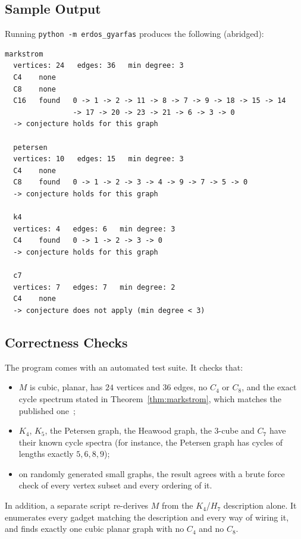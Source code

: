 \documentclass[11pt,a4paper]{article}
\theoremstyle{definition}
\newcommand{\C}[1]{C_{#1}}
\begin{document}
\subsection{Sample Output}

Running \texttt{python -m erdos\_gyarfas} produces the following (abridged):

\begin{lstlisting}[language={},numbers=none]
  markstrom
  vertices: 24   edges: 36   min degree: 3
  C4    none
  C8    none
  C16   found   0 -> 1 -> 2 -> 11 -> 8 -> 7 -> 9 -> 18 -> 15 -> 14
                -> 17 -> 20 -> 23 -> 21 -> 6 -> 3 -> 0
  -> conjecture holds for this graph

  petersen
  vertices: 10   edges: 15   min degree: 3
  C4    none
  C8    found   0 -> 1 -> 2 -> 3 -> 4 -> 9 -> 7 -> 5 -> 0
  -> conjecture holds for this graph

  k4
  vertices: 4   edges: 6   min degree: 3
  C4    found   0 -> 1 -> 2 -> 3 -> 0
  -> conjecture holds for this graph

  c7
  vertices: 7   edges: 7   min degree: 2
  C4    none
  -> conjecture does not apply (min degree < 3)
\end{lstlisting}

\subsection{Correctness Checks}

The program comes with an automated test suite. It checks that:
\begin{itemize}
  \item $M$ is cubic, planar, has $24$ vertices and $36$ edges, no $\C4$ or
        $\C8$, and the exact cycle spectrum stated in
        Theorem~\ref{thm:markstrom}, which matches the published
        one~\cite{mathworld};
  \item $K_4$, $K_5$, the Petersen graph, the Heawood graph, the $3$-cube and
        $\C7$ have their known cycle spectra (for instance, the Petersen graph
        has cycles of lengths exactly $5,6,8,9$);
  \item on randomly generated small graphs, the result agrees with a brute
        force check of every vertex subset and every ordering of it.
\end{itemize}
In addition, a separate script re-derives $M$ from the $K_4$/$H_7$ description
alone. It enumerates every gadget matching the description and every way of
wiring it, and finds exactly one cubic planar graph with no $\C4$ and no $\C8$.
\end{document}
